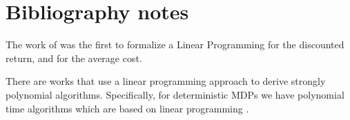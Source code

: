 
% 
% 
% 


\section{Bibliography notes}




The work of \cite{d1963probabilistic} was the first to formalize a Linear Programming for the discounted return, and \cite{manne1960linear} for the average cost. 

There are works that use a linear programming approach to derive strongly polynomial algorithms. Specifically, for deterministic MDPs we have polynomial time algorithms which are based on linear programming \cite{MadaniTZ10,PostY13}.